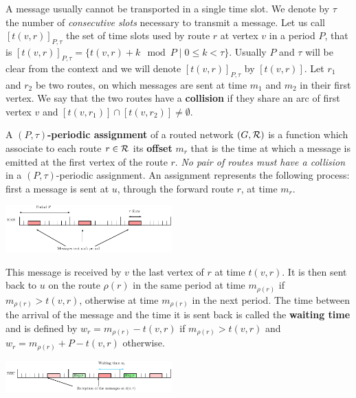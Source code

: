 \documentclass[10pt, conference, letterpaper]{IEEEtran}
\begin{document}
      A message usually cannot be transported in a single time slot. We denote by $\tau$ the number 
      of \emph{consecutive slots} necessary to transmit a message. Let us call $[t(v,r)]_{P,\tau}$ the set of time slots used by route $r$ at vertex $v$ in a period $P$, that is $[t(v,r)]_{P,\tau} = \{t(v,r) + k \mod P \mid 0 \leq k < \tau \}$. Usually $P$ and $\tau$ will be clear from the context and we will denote $[t(v,r)]_{P,\tau}$ by $[t(v,r)]$.
      Let $r_1$ and $r_2$ be two routes, on which messages are sent at time $m_1$ and $m_2$ in their first vertex.
      We say that the two routes have a {\bf collision} if they share an arc of first vertex $v$ and $[t(v,r_{1})] \cap [t(v,r_{2})] \neq \emptyset$.
      
         A {\bf $(P,\tau)$-periodic assignment} of a routed network $(G,\cal R)$ is a function which associate to each route 
         $r \in \cal R$ its \textbf{offset} $m_r$ that is the time at which a message is emitted at the first vertex of the route $r$. \emph{No pair of routes must have a collision} in a $(P,\tau)$-periodic assignment.
	 An assignment represents the following process: first a message is sent at $u$, through the forward route $r$, at time $m_r$.
      \begin{center}
     \hspace{-0.5cm} \includegraphics[width=0.48\textwidth]{rrh.pdf}
      \end{center}

      This message is received by $v$ the last vertex of $r$ at time $t(v,r)$. It is then sent back to $u$ on the route $\rho(r)$ in the same period at time $m_{\rho(r)}$ if $m_{\rho(r)} > t(v,r)$, otherwise at time $m_{\rho(r)}$ in the next period. The time between the arrival of the message and the time it is sent back is called the \textbf{waiting time} and is defined by $w_r = m_{\rho(r)} - t(v,r)$ if $m_{\rho(r)} > t(v,r)$ and $w_r = m_{\rho(r)} + P - t(v,r)$ otherwise.
 
       \begin{center}
     \hspace{-0.5cm} \includegraphics[width=0.48\textwidth]{BBU.pdf}
      \end{center}
     
\end{document}
